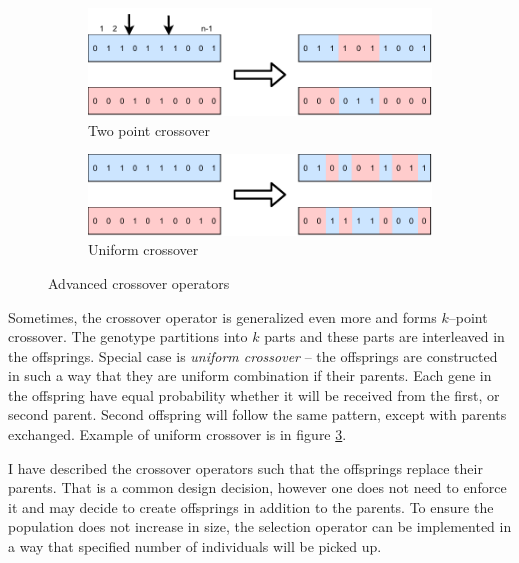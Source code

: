 \begin{figure}
    \begin{subfigure}[b]{0.4\textwidth}
        \includegraphics[width=\textwidth]{img/master_twopointcrossover.pdf}
        \caption{Two point crossover}
        \label{fig:gatwopointcrossover}
    \end{subfigure}
    \hfill
    \begin{subfigure}[b]{0.4\textwidth}
        \includegraphics[width=\textwidth]{img/master_uniformcrossover.pdf}
        \caption{Uniform crossover}
        \label{fig:uniformcrossover}
    \end{subfigure}
    \caption{Advanced crossover operators}
\end{figure}

Sometimes, the crossover operator is generalized even more and forms $k$--point crossover. The genotype partitions into $k$ parts and these parts are interleaved in the offsprings. Special case is \emph{uniform crossover} -- the offsprings are constructed in such a way that they are uniform combination if their parents. Each gene in the offspring have equal probability whether it will be received from the first, or second parent. Second offspring will follow the same pattern, except with parents exchanged. Example of uniform crossover is in figure \ref{fig:uniformcrossover}.

I have described the crossover operators such that the offsprings replace their parents. That is a common design decision, however one does not need to enforce it and may decide to create offsprings in addition to the parents. To ensure the population does not increase in size, the selection operator can be implemented in a way that specified number of individuals will be picked up.

